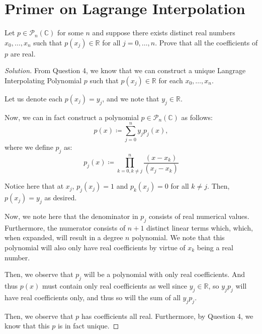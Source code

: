 \documentclass{article}
\newenvironment{solution}{\begin{proof}[Solution]}{\end{proof}}
\newcommand{\CC}{\mathbb{C}}
\newcommand{\RR}{\mathbb{R}}
\begin{document}
	\section{Primer on Lagrange Interpolation}
	\begin{hw}
		Let $p \in \mathscr{P}_{n}(\CC)$ for some $n$ and suppose there exists distinct real numbers $x_{0}, \ldots, x_{n}$ such that $p(x_{j}) \in \RR$ for all $j = 0, \ldots, n$. Prove that all the coefficients of $p$ are real.
	\end{hw}
	\begin{solution}
		From Question 4, we know that we can construct a unique Langrage Interpolating Polynomial $p$ such that $p(x_{j}) \in \RR$ for each $x_{0}, \ldots, x_{n}$.
		
		Let us denote each $p(x_{j}) = y_{j}$, and we note that $y_{j} \in \RR$.
		
		Now, we can in fact construct a polynomial $p \in \mathscr{P}_{n}(\CC)$ as follows:
		\begin{equation*}
			p(x) \coloneq \sum_{j=0}^{n} y_{j}p_{j}(x),
		\end{equation*}
		where we define $p_{j}$ as:
		\begin{equation*}
			p_{j}(x) \coloneq \prod_{k=0, k\neq j}^{n} \dfrac{(x-x_{k})}{(x_{j} - x_{k})}
		\end{equation*}
	
		Notice here that at $x_{j}$, $p_{j}(x_{j}) = 1$ and $p_{k}(x_{j}) = 0$ for all $k \neq j$. Then, $p(x_{j}) = y_{j}$ as desired.
	
		Now, we note here that the denominator in $p_{j}$ consists of real numerical values. Furthermore, the numerator consists of $n+1$ distinct linear terms which, which, when expanded, will result in a degree $n$ polynomial. We note that this polynomial will also only have real coefficients by virtue of $x_{k}$ being a real number.
		
		Then, we observe that $p_{j}$ will be a polynomial with only real coefficients. And thus $p(x)$ must contain only real coefficients as well since $y_{j} \in \RR$, so $y_{j}p_{j}$ will have real coefficients only, and thus so will the sum of all $y_{j}p_{j}$.
		
		Then, we observe that $p$ has coefficients all real. Furthermore, by Question 4, we know that this $p$ is in fact unique.
	\end{solution}
 
	\newpage
	
\end{document}
